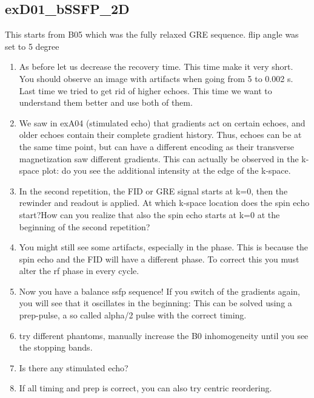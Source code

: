 \documentclass[a4paper,12pt]{extarticle}
\begin{document}
\subsection{exD01\_bSSFP\_2D}
This starts from B05 which was the fully relaxed GRE sequence. 
flip angle was set to 5 degree
\begin{enumerate}

\item As before let us decrease the recovery time. This time make it very short. You should observe an image with artifacts when going from 5 to 0.002 s. Last time we tried to get rid of higher echoes. This time we want to understand them better and use both of them.
				
\item We saw in exA04 (stimulated echo) that gradients act on certain echoes, and older echoes contain their complete gradient history. Thus, echoes can be at the same time point, but can have a different encoding as their transverse magnetization saw different gradients. This can actually be observed in the k-space plot: do you see the additional intensity at the edge of the k-space.

\item  In the second repetition, the FID or GRE signal starts at k=0, then the rewinder and readout is applied. At which k-space location does the spin echo start?How can you realize that also the spin echo starts at k=0 at the beginning of the second repetition?
\item You might still see some artifacts, especially in the phase. This is because the spin echo and the FID will have a different phase. To correct this you must alter the rf phase in every cycle. 

\item Now you have a balance ssfp sequence!  If you switch of the gradients again, you will see that it oscillates in the beginning: This can be solved using  a prep-pulse, a so called alpha/2 pulse with the correct timing.

\item try different phantoms,  manually increase the B0 inhomogeneity until you see the stopping bands.

\item  Is there any stimulated echo?

\item If all timing and prep is correct, you can also try centric reordering.

\end{enumerate}
\end{document}
